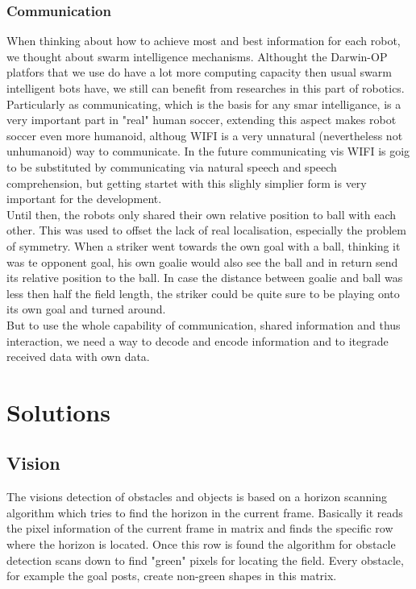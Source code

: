 \documentclass[lnicst,a4paper]{svmultln}
\begin{document}
\subsubsection{Communication}
When thinking about how to achieve most and best information for each robot, we thought about swarm intelligence mechanisms. Althought the Darwin-OP platfors that we use do have a lot more computing capacity then usual swarm intelligent bots have, we still can benefit from researches in this part of robotics. 
\\
Particularly as communicating, which is the basis for any smar intelligance, is a very important part in "real" human soccer, extending this aspect makes robot soccer even more humanoid, althoug WIFI is a very unnatural (nevertheless not unhumanoid) way to communicate. In the future communicating vis WIFI is goig to be substituted by communicating via natural speech and speech comprehension, but getting startet with this slighly simplier form is very important for the development.
\\
Until then, the robots only shared their own relative position to ball with each other. This was used to offset the lack of real localisation, especially the problem of symmetry. When a striker went towards the own goal with a ball, thinking it was te opponent goal, his own goalie would also see the ball and in return send its relative position to the ball. In case the distance between goalie and ball was less then half the field length, the striker could be quite sure to be playing onto its own goal and turned around. 
\\
But to use the whole capability of communication, shared information and thus interaction, we need a way to decode and encode information and to itegrade received data with own data.






\section{Solutions}


\subsection{Vision}
The visions detection of obstacles and objects is based on a horizon scanning algorithm which tries to find the horizon in the current frame. Basically it reads the pixel information of the current frame in matrix and finds the specific row where the horizon is located.
Once this row is found the algorithm for obstacle detection scans down to find "green" pixels for locating the field. Every obstacle, for example the goal posts, create non-green shapes in this matrix.
\end{document}
